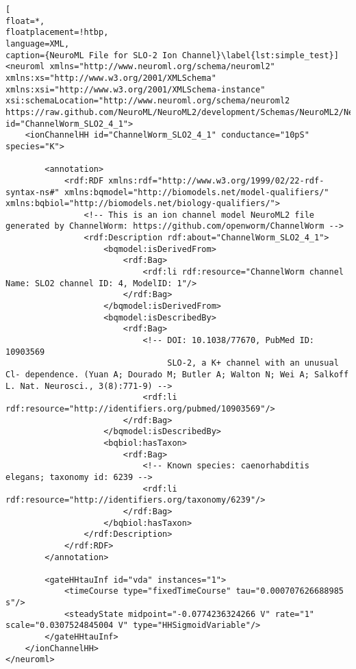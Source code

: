 \documentclass[10pt,a4paper]{article}
\begin{document}
\begin{lstlisting}[
float=*,
floatplacement=!htbp,
language=XML,
caption={NeuroML File for SLO-2 Ion Channel}\label{lst:simple_test}]
<neuroml xmlns="http://www.neuroml.org/schema/neuroml2"  xmlns:xs="http://www.w3.org/2001/XMLSchema" xmlns:xsi="http://www.w3.org/2001/XMLSchema-instance" xsi:schemaLocation="http://www.neuroml.org/schema/neuroml2 https://raw.github.com/NeuroML/NeuroML2/development/Schemas/NeuroML2/NeuroML_v2beta4.xsd" id="ChannelWorm_SLO2_4_1">
    <ionChannelHH id="ChannelWorm_SLO2_4_1" conductance="10pS" species="K">
        
        <annotation>
            <rdf:RDF xmlns:rdf="http://www.w3.org/1999/02/22-rdf-syntax-ns#" xmlns:bqmodel="http://biomodels.net/model-qualifiers/" xmlns:bqbiol="http://biomodels.net/biology-qualifiers/">
                <!-- This is an ion channel model NeuroML2 file generated by ChannelWorm: https://github.com/openworm/ChannelWorm -->
                <rdf:Description rdf:about="ChannelWorm_SLO2_4_1">
                    <bqmodel:isDerivedFrom>
                        <rdf:Bag>
                            <rdf:li rdf:resource="ChannelWorm channel Name: SLO2 channel ID: 4, ModelID: 1"/>
                        </rdf:Bag>
                    </bqmodel:isDerivedFrom>
                    <bqmodel:isDescribedBy>
                        <rdf:Bag>
                            <!-- DOI: 10.1038/77670, PubMed ID: 10903569 
                                 SLO-2, a K+ channel with an unusual Cl- dependence. (Yuan A; Dourado M; Butler A; Walton N; Wei A; Salkoff L. Nat. Neurosci., 3(8):771-9) -->
                            <rdf:li rdf:resource="http://identifiers.org/pubmed/10903569"/>
                        </rdf:Bag>
                    </bqmodel:isDescribedBy>
                    <bqbiol:hasTaxon>
                        <rdf:Bag>
                            <!-- Known species: caenorhabditis elegans; taxonomy id: 6239 -->
                            <rdf:li rdf:resource="http://identifiers.org/taxonomy/6239"/>
                        </rdf:Bag>
                    </bqbiol:hasTaxon>
                </rdf:Description>
            </rdf:RDF>
        </annotation>

        <gateHHtauInf id="vda" instances="1">
            <timeCourse type="fixedTimeCourse" tau="0.000707626688985 s"/>
            <steadyState midpoint="-0.0774236324266 V" rate="1" scale="0.0307524845004 V" type="HHSigmoidVariable"/>
        </gateHHtauInf>
    </ionChannelHH>
</neuroml>


\end{lstlisting}
\end{document}
